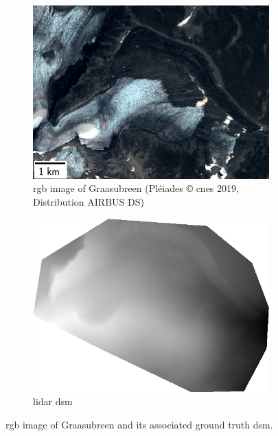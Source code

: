 \begin{figure}
    \centering
    \begin{subfigure}[t]{0.48\linewidth}
        \flushleft
        \includegraphics[width=\linewidth]{Images/Chap_6/miniature_Graasubreen.png}
        \caption{\acrshort{rgb} image of Graasubreen (Pléiades © \acrshort{cnes} 2019, Distribution AIRBUS DS)}
        \label{fig:miniature_Graasubreen_rgb}
    \end{subfigure}\hfill
    \begin{subfigure}[t]{0.48\linewidth}
        \flushright
        \includegraphics[width=\linewidth]{Images/Chap_6/miniature_Graasubreen_gt.png}
        \caption{\acrshort{lidar} \acrshort{dsm}}
        \label{fig:miniature_Graasubreen_gt}
    \end{subfigure}
    \caption{\acrshort{rgb} image of Graasubreen and its associated ground truth \acrshort{dsm}.}
    \label{fig:miniature_Graasubreen}
\end{figure}

